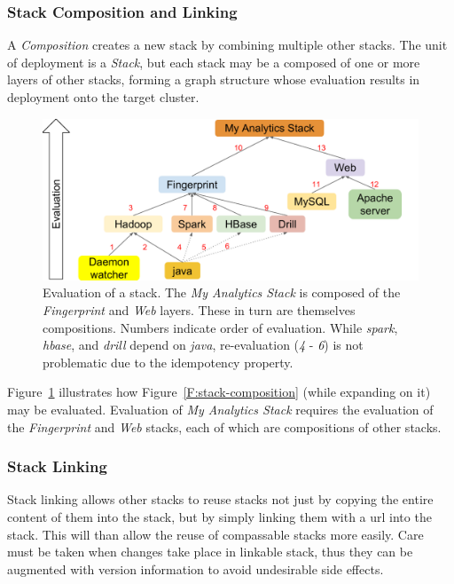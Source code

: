 \subsubsection{Stack Composition and Linking} \label{S:composition}

A {\it Composition} creates a new stack by combining multiple other
stacks.  The unit of deployment is a {\it Stack}, but each stack may
be a composed of one or more layers of other stacks, forming a graph
structure whose evaluation results in deployment onto the target
cluster.

\begin{figure}
\centering
\includegraphics[width=1\columnwidth]{images/cloudmesh-stack-graph.pdf}
\caption{Evaluation of a stack.
  The {\it My Analytics Stack} is composed of the {\it Fingerprint} and {\it Web} layers.
  These in turn are themselves compositions.
  Numbers indicate order of evaluation.
  While {\it spark}, {\it hbase}, and {\it drill} depend on {\it java}, 
  re-evaluation (\textit{4} - \textit{6}) is not problematic due to the idempotency property.
  \label{F:stack-graph}}
\end{figure}

Figure~\ref{F:stack-graph} illustrates how Figure~\ref{F:stack-composition} (while expanding on it) may be evaluated.
Evaluation of {\it My Analytics Stack} requires the evaluation of the
{\it Fingerprint} and {\it Web} stacks, each of which are compositions of other stacks.


\subsubsection{Stack Linking} \label{S:stack-linking}

Stack linking allows other stacks to reuse stacks not just by copying
the entire content of them into the stack, but by simply linking them
with a url into the stack. This will than allow the reuse of
compassable stacks more easily. Care must be taken when changes take
place in linkable stack, thus they can be augmented with version
information to avoid undesirable side effects.

